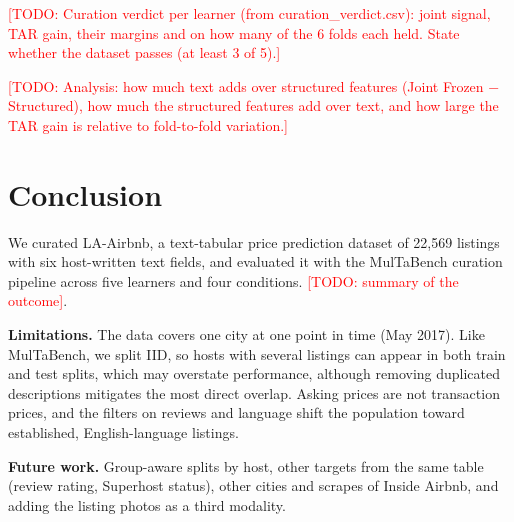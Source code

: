 \documentclass{article}
\newcommand{\todo}[1]{\textcolor{red}{[TODO: #1]}}
\begin{document}
\todo{Curation verdict per learner (from curation\_verdict.csv): joint signal, TAR gain, their margins and on how
many of the 6 folds each held. State whether the dataset passes (at least 3 of 5).}

\todo{Analysis: how much text adds over structured features (Joint Frozen $-$ Structured), how much the structured
features add over text, and how large the TAR gain is relative to fold-to-fold variation.}

\section{Conclusion}

We curated LA-Airbnb, a text-tabular price prediction dataset of 22,569 listings with six host-written text fields,
and evaluated it with the MulTaBench curation pipeline across five learners and four conditions.
\todo{summary of the outcome}.

\textbf{Limitations.} The data covers one city at one point in time (May 2017). Like MulTaBench, we split IID, so
hosts with several listings can appear in both train and test splits, which may overstate performance, although
removing duplicated descriptions mitigates the most direct overlap. Asking prices are not transaction prices, and
the filters on reviews and language shift the population toward established, English-language listings.

\textbf{Future work.} Group-aware splits by host, other targets from the same table (review rating, Superhost
status), other cities and scrapes of Inside Airbnb, and adding the listing photos as a third modality.



\end{document}
